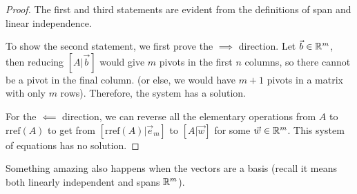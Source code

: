 \begin{proof}
	The first and third statements are evident from the definitions of span and linear independence.

	To show the second statement, we first prove the $\implies$ direction.
	Let $\vec{b}\in\mathbb{R}^m$, then reducing $[A|\vec{b}]$ would give $m$ pivots in the first $n$ columns, so there cannot be a pivot in the final column.
		(or else, we would have $m+1$ pivots in a matrix with only $m$ rows). Therefore, the system has a solution.

	For the $\impliedby$ direction, we can reverse all the elementary operations from $A$ to $\textrm{rref}(A)$ to get from
	$[\textrm{rref}(A)|\vec{e}_m]$ to $[A|\vec{w}]$ for some $\vec{w}\in\mathbb{R}^m$. This system of equations has no solution.
\end{proof}

Something amazing also happens when the vectors are a basis (recall it means both linearly independent and spans $\mathbb{R}^m$).

